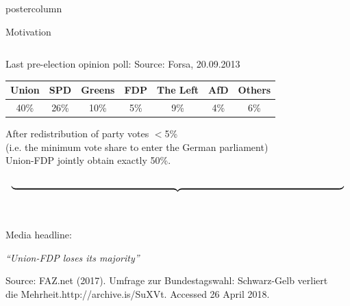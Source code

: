 \documentclass[final,hyperref={pdfpagelabels=false}]{beamer}
\newcommand{\darkgray}[1]{\textcolor{koaladarkgray}{#1}}
\newcommand{\lightgray}[1]{\textcolor{koalagray}{#1}}
\begin{document}
\begin{frame}
\begin{columns}
\begin{column}{1\textwidth}
\begin{beamercolorbox}[center,wd=\textwidth]{postercolumn}
\begin{minipage}[T]{.95\textwidth}
\begin{block}{\footnotesize Motivation}
{{\begin{minipage}{.96\textwidth}
\begin{columns}[t]
  \begin{column}{.29\textwidth}
  \darkgray{Last pre-election opinion poll:} \lightgray{\tiny Source: Forsa, 20.09.2013}
  \\[2.5ex]
  \begin{center}\centering
  \begin{tabular}{ccccccc}
  \toprule
  \darkgray{Union} & {\footnotesize \lightgray{SPD}} & {\footnotesize \lightgray{Greens}} & \darkgray{FDP} & {\footnotesize \lightgray{The Left}} & {\footnotesize \lightgray{AfD}} & {\footnotesize \lightgray{Others}} \\ \midrule
  \darkgray{40\%} & {\footnotesize \lightgray{26\%}} & {\footnotesize \lightgray{10\%}} & \darkgray{5\%} & {\footnotesize \lightgray{9\%}} & {\footnotesize \lightgray{4\%}} & {\footnotesize \lightgray{6\%}} \\
  \bottomrule
  \end{tabular}
  \end{center}
  \vspace{1.5ex}
  \begin{center}\centering
  \darkgray{After redistribution} \lightgray{\footnotesize of party votes $<$5\% \\ (i.e. the minimum vote share to enter the German parliament)} \\
  \darkgray{Union-FDP} \lightgray{\footnotesize jointly} \darkgray{obtain} \lightgray{\footnotesize exactly} \darkgray{50\%}.
  \end{center}
  \vspace{-3ex}
  \textcolor{koalablue}{$$ \underbrace{\resizebox{\hsize}{!}{ }}_{ } $$}
  \ \\ \vspace{-2ex}
  \begin{mdleftred}
  \begin{minipage}{\textwidth}
  \lightgray{\footnotesize Media headline:}
  \\
  \begin{center}\centering
  \vspace{-2ex}
  \darkgray{\textit{``Union-FDP loses its majority''}}
  \vspace{-.2ex}
  \end{center}
  \lightgray{\tiny Source: FAZ.net (2017). Umfrage zur Bundestagswahl: Schwarz-Gelb verliert \\[-2ex]
  die Mehrheit.http://archive.is/SuXVt. Accessed 26 April 2018.}
  \end{minipage}
  \end{mdleftred}
  \end{column}


\end{columns}
\end{minipage}}}
\end{block}
\end{minipage}
\end{beamercolorbox}
\end{column}
\end{columns}
\end{frame}
\end{document}
